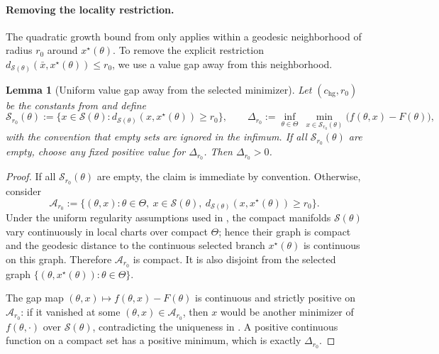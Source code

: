 \documentclass{article}
\theoremstyle{normaltheorem}
\newtheorem{lemma}[lemma]{Lemma}
\newcommand{\calS}{\mathcal{S}}
\begin{document}
\paragraph{Removing the locality restriction.}
The quadratic growth bound from  only applies within a geodesic neighborhood of radius $r_0$ around $x^\star(\theta)$.
To remove the explicit restriction $d_{\calS(\theta)}(\bar x, x^\star(\theta))\le r_0$, we use a value gap away from this neighborhood.

\begin{lemma}[Uniform value gap away from the selected minimizer]\label{lem:away-gap-positive}
Let $(c_{\mathrm{hg}},r_0)$ be the constants from  and define
\[
\calS_{r_0}(\theta)
:=
\{x\in\calS(\theta): d_{\calS(\theta)}(x,x^\star(\theta))\ge r_0\},
\qquad
\Delta_{r_0}
:=
\inf_{\theta\in\Theta}\ \min_{x\in\calS_{r_0}(\theta)}\big(f(\theta,x)-F(\theta)\big),
\]
with the convention that empty sets are ignored in the infimum. If all \(\calS_{r_0}(\theta)\) are empty, choose any fixed positive value for \(\Delta_{r_0}\).
Then \(\Delta_{r_0}>0\).
\end{lemma}
\begin{proof}
If all \(\calS_{r_0}(\theta)\) are empty, the claim is immediate by convention.
Otherwise, consider
\[
\mathcal A_{r_0}
:=
\{(\theta,x):\theta\in\Theta,\ x\in\calS(\theta),\ d_{\calS(\theta)}(x,x^\star(\theta))\ge r_0\}.
\]
Under the uniform regularity assumptions used in , the compact manifolds \(\calS(\theta)\) vary continuously in local charts over compact \(\Theta\); hence their graph is compact and the geodesic distance to the continuous selected branch \(x^\star(\theta)\) is continuous on this graph. Therefore \(\mathcal A_{r_0}\) is compact. It is also disjoint from the selected graph \(\{(\theta,x^\star(\theta)):\theta\in\Theta\}\).

The gap map \((\theta,x)\mapsto f(\theta,x)-F(\theta)\) is continuous and strictly positive on \(\mathcal A_{r_0}\): if it vanished at some \((\theta,x)\in\mathcal A_{r_0}\), then \(x\) would be another minimizer of \(f(\theta,\cdot)\) over \(\calS(\theta)\), contradicting the uniqueness in . A positive continuous function on a compact set has a positive minimum, which is exactly \(\Delta_{r_0}\).
\end{proof}
\end{document}
